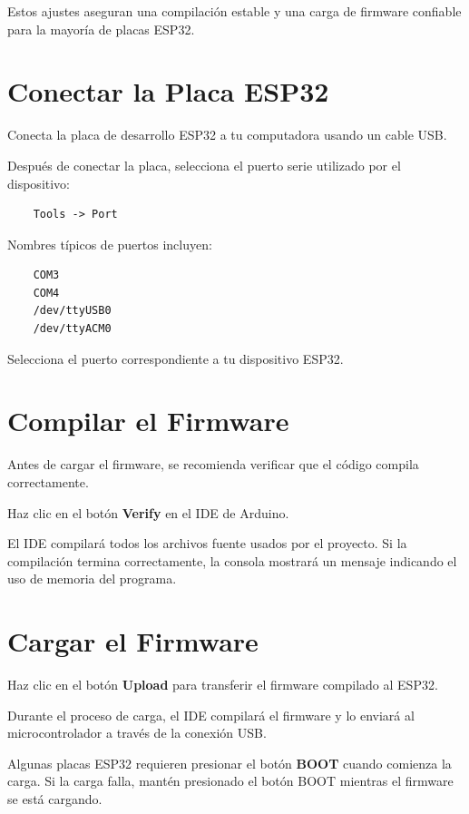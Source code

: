 Estos ajustes aseguran una compilación estable y una carga de firmware confiable para la mayoría de placas ESP32.

\section{Conectar la Placa ESP32}

Conecta la placa de desarrollo ESP32 a tu computadora usando un cable USB.

Después de conectar la placa, selecciona el puerto serie utilizado por el dispositivo:

\begin{verbatim}
    Tools -> Port
\end{verbatim}

Nombres típicos de puertos incluyen:

\begin{verbatim}
    COM3
    COM4
    /dev/ttyUSB0
    /dev/ttyACM0
\end{verbatim}

Selecciona el puerto correspondiente a tu dispositivo ESP32.

\section{Compilar el Firmware}

Antes de cargar el firmware, se recomienda verificar que el código compila correctamente.

Haz clic en el botón \textbf{Verify} en el IDE de Arduino.

El IDE compilará todos los archivos fuente usados por el proyecto. Si la compilación termina correctamente,
la consola mostrará un mensaje indicando el uso de memoria del programa.

\section{Cargar el Firmware}

Haz clic en el botón \textbf{Upload} para transferir el firmware compilado al ESP32.

Durante el proceso de carga, el IDE compilará el firmware y lo enviará al microcontrolador a través de la conexión USB.

Algunas placas ESP32 requieren presionar el botón \textbf{BOOT} cuando comienza la carga. Si la carga falla,
mantén presionado el botón BOOT mientras el firmware se está cargando.

